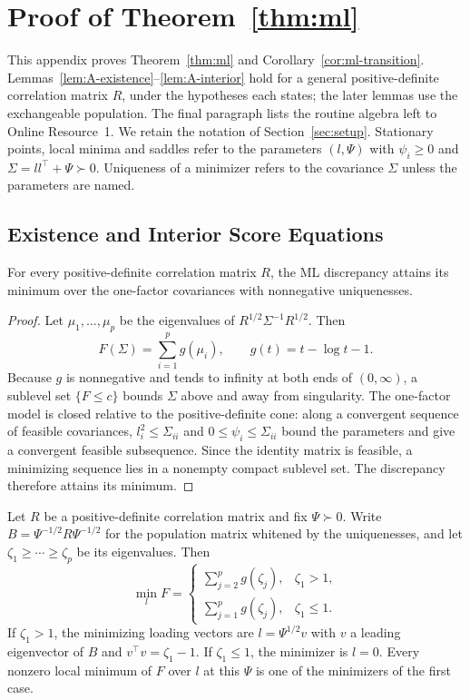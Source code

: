 \section{Proof of Theorem~\ref{thm:ml}}
\label{app:ml}

This appendix proves Theorem~\ref{thm:ml} and Corollary~\ref{cor:ml-transition}. Lemmas~\ref{lem:A-existence}--\ref{lem:A-interior} hold for a general positive-definite correlation matrix $R$, under the hypotheses each states; the later lemmas use the exchangeable population. The final paragraph lists the routine algebra left to Online Resource~1. We retain the notation of Section~\ref{sec:setup}. Stationary points, local minima and saddles refer to the parameters $(l,\Psi)$ with $\psi_i\ge0$ and $\Sigma=ll^{\top}+\Psi\succ0$. Uniqueness of a minimizer refers to the covariance $\Sigma$ unless the parameters are named.

\subsection{Existence and Interior Score Equations}

\begin{applemma}[Existence]
\label{lem:A-existence}
For every positive-definite correlation matrix $R$, the ML discrepancy attains its minimum over the one-factor covariances with nonnegative uniquenesses.
\end{applemma}

\begin{proof}
Let $\mu_1,\ldots,\mu_p$ be the eigenvalues of $R^{1/2}\Sigma^{-1}R^{1/2}$. Then
\[
F(\Sigma)=\sum_{i=1}^p g(\mu_i),\qquad g(t)=t-\log t-1.
\]
Because $g$ is nonnegative and tends to infinity at both ends of $(0,\infty)$, a sublevel set $\{F\le c\}$ bounds $\Sigma$ above and away from singularity. The one-factor model is closed relative to the positive-definite cone: along a convergent sequence of feasible covariances, $l_i^2\le\Sigma_{ii}$ and $0\le\psi_i\le\Sigma_{ii}$ bound the parameters and give a convergent feasible subsequence. Since the identity matrix is feasible, a minimizing sequence lies in a nonempty compact sublevel set. The discrepancy therefore attains its minimum.
\end{proof}

\begin{applemma}
\label{lem:A-concentration}
Let $R$ be a positive-definite correlation matrix and fix $\Psi\succ0$. Write $B=\Psi^{-1/2}R\Psi^{-1/2}$ for the population matrix whitened by the uniquenesses, and let $\zeta_1\ge\cdots\ge\zeta_p$ be its eigenvalues. Then
\[
\min_l F=
\begin{cases}
\displaystyle\sum_{j=2}^p g(\zeta_j),&\zeta_1>1,\\[2pt]
\displaystyle\sum_{j=1}^p g(\zeta_j),&\zeta_1\le1.
\end{cases}
\]
If $\zeta_1>1$, the minimizing loading vectors are $l=\Psi^{1/2}v$ with $v$ a leading eigenvector of $B$ and $v^{\top}v=\zeta_1-1$. If $\zeta_1\le1$, the minimizer is $l=0$. Every nonzero local minimum of $F$ over $l$ at this $\Psi$ is one of the minimizers of the first case.
\end{applemma}


